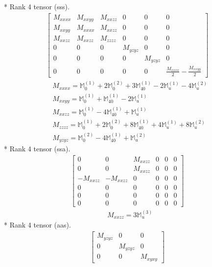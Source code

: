 \documentclass[fleqn,8pt,landscape]{jsarticle}
\begin{document}
* Rank 4 tensor (sss).
\begin{align*}
\begin{bmatrix} M_{xxxx} & M_{xxyy} & M_{xxzz} & 0 & 0 & 0 \\ M_{xxyy} & M_{xxxx} & M_{xxzz} & 0 & 0 & 0 \\ M_{xxzz} & M_{xxzz} & M_{zzzz} & 0 & 0 & 0 \\ 0 & 0 & 0 & M_{yzyz} & 0 & 0 \\ 0 & 0 & 0 & 0 & M_{yzyz} & 0 \\ 0 & 0 & 0 & 0 & 0 & \frac{M_{xxxx}}{2} - \frac{M_{xxyy}}{2} \end{bmatrix}
\end{align*}
\begin{align*}
& M_{xxxx} = \mathbb{M}_{0}^{(1)} + 2 \mathbb{M}_{0}^{(2)} + 3 \mathbb{M}_{40}^{(1)} - 2 \mathbb{M}_{u}^{(1)} - 4 \mathbb{M}_{u}^{(2)} \\
& M_{xxyy} = \mathbb{M}_{0}^{(1)} + \mathbb{M}_{40}^{(1)} - 2 \mathbb{M}_{u}^{(1)} \\
& M_{xxzz} = \mathbb{M}_{0}^{(1)} - 4 \mathbb{M}_{40}^{(1)} + \mathbb{M}_{u}^{(1)} \\
& M_{zzzz} = \mathbb{M}_{0}^{(1)} + 2 \mathbb{M}_{0}^{(2)} + 8 \mathbb{M}_{40}^{(1)} + 4 \mathbb{M}_{u}^{(1)} + 8 \mathbb{M}_{u}^{(2)} \\
& M_{yzyz} = \mathbb{M}_{0}^{(2)} - 4 \mathbb{M}_{40}^{(1)} + \mathbb{M}_{u}^{(2)}
\end{align*}
* Rank 4 tensor (ssa).
\begin{align*}
\begin{bmatrix} 0 & 0 & M_{xxzz} & 0 & 0 & 0 \\ 0 & 0 & M_{xxzz} & 0 & 0 & 0 \\ - M_{xxzz} & - M_{xxzz} & 0 & 0 & 0 & 0 \\ 0 & 0 & 0 & 0 & 0 & 0 \\ 0 & 0 & 0 & 0 & 0 & 0 \\ 0 & 0 & 0 & 0 & 0 & 0 \end{bmatrix}
\end{align*}
\begin{align*}
& M_{xxzz} = 3 \mathbb{M}_{u}^{(3)}
\end{align*}
* Rank 4 tensor (aas).
\begin{align*}
\begin{bmatrix} M_{yzyz} & 0 & 0 \\ 0 & M_{yzyz} & 0 \\ 0 & 0 & M_{xyxy} \end{bmatrix}
\end{align*}
\end{document}
